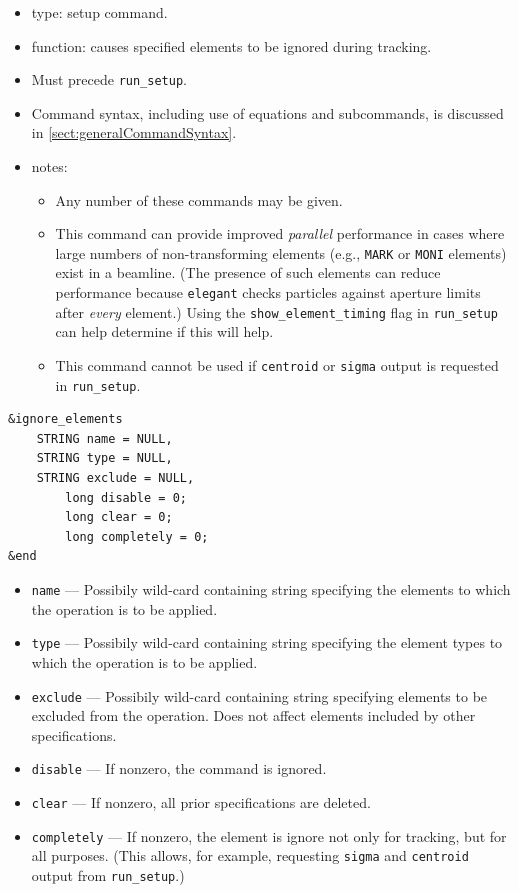 \documentclass[11pt]{article}
\begin{document}
\begin{itemize}
\item type: setup command.
\item function: causes specified elements to be ignored during tracking.
\item Must precede \verb|run_setup|.
\item Command syntax, including use of equations and subcommands, is discussed in \ref{sect:generalCommandSyntax}.
\item notes: 
	\begin{itemize}
	\item Any number of these commands may be given.
	\item This command can provide improved {\em parallel} performance in cases where large numbers
          of non-transforming elements (e.g., \verb|MARK| or \verb|MONI| elements) exist in a beamline.
          (The presence of such elements can reduce performance because \verb|elegant| checks particles against aperture
          limits after {\em every} element.)
          Using the \verb|show_element_timing| flag in \verb|run_setup| can help determine if this
          will help.
        \item This command cannot be used if \verb|centroid| or \verb|sigma| output is requested in
          \verb|run_setup|.
	\end{itemize}
\end{itemize}

\begin{verbatim}
&ignore_elements
	STRING name = NULL,
	STRING type = NULL,
	STRING exclude = NULL,
        long disable = 0;
        long clear = 0;
        long completely = 0;
&end
\end{verbatim}

\begin{itemize}
\item \verb|name| --- Possibily wild-card containing string specifying the
	elements to which the operation is to be applied.
\item \verb|type| --- Possibily wild-card containing string specifying the
	element types to which the operation is to be applied.
\item \verb|exclude| --- Possibily wild-card containing string specifying 
	elements to be excluded from the operation. Does not
	affect elements included by other specifications.
\item \verb|disable| --- If nonzero, the command is ignored.
\item \verb|clear| --- If nonzero, all prior specifications are deleted.
\item \verb|completely| --- If nonzero, the element is ignore not only for tracking, but
  for all purposes. (This allows, for example, requesting \verb|sigma| and \verb|centroid| output
  from \verb|run_setup|.)
\end{itemize}
\end{document}
